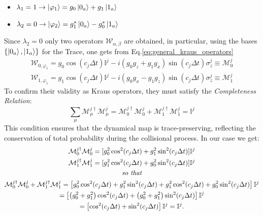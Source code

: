\documentclass[a4paper,12pt]{article}
\begin{document}
\begin{itemize}
	\item $\lambda_1 = 1 \rightarrow \ket{\varphi_1} = g_0 \ket{0_a} + g_1 \ket{1_a} $

	\item $\lambda_2 = 0 \rightarrow \ket{\varphi_2} = g_1^* \ket{0_a} - g_0^* \ket{1_a} $
\end{itemize}
Since $ \lambda_2 = 0 $ only two operators $ \mathcal{W}_{\alpha, \beta} $ are obtained, in particular, using the bases $ \{ \ket{0_{a}}, \ket{1_{a}} \} $ for the Trace, one gets from Eq.\ref{eq:general_kraus_operators}
\begin{gather}
	\mathcal{W}_{0, \varphi_{1}} = g_0 \cos{\left(c_j \Delta t \right)} \mathbb{I}^{j} - i \left(g_0 g_z + g_1 g_x \right) \sin{\left(c_j \Delta t \right)} \sigma_{z}^{j} \equiv \mathcal{M}_{0}^{j} \\
	\mathcal{W}_{1, \varphi_{1}} = g_1 \cos{\left(c_j \Delta t \right)} \mathbb{I}^{j} - i \left(g_0 g_x - g_1 g_z \right) \sin{\left(c_j \Delta t \right)} \sigma_{z}^{j} \equiv \mathcal{M}_{1}^{j}
\end{gather}
To confirm their validity as Kraus operators, they must satisfy the \textit{Completeness Relation}:
\begin{equation}
	\sum_{\mu} \mathcal{M}_{\mu}^{j \dagger} \mathcal{M}_{\mu}^{j} = \mathcal{M}_{0}^{j \dagger}\mathcal{M}_{0}^{j} + \mathcal{M}_{1}^{j \dagger}\mathcal{M}_{1}^{j} = \mathbb{I}^{j}
	\label{eq:completeness_relation}
\end{equation}
This condition ensures that the dynamical map is trace-preserving, reflecting the conservation of total probability during the collisional process.
In our case we get:
\begin{gather}
	\mathcal{M}_{0}^{j \dagger}\mathcal{M}_{0}^{j} = [g_0^2 \cos^2(c_j \Delta t) + g_1^2 \sin^2(c_j \Delta t)] \mathbb{I}^{j} \notag \\
	\mathcal{M}_{1}^{j \dagger}\mathcal{M}_{1}^{j} = [g_1^2 \cos^2(c_j \Delta t) + g_0^2 \sin^2(c_j \Delta t)] \mathbb{I}^{j} \notag \\
	\textit{so that} \notag \\
	\mathcal{M}_{0}^{j \dagger}\mathcal{M}_{0}^{j} + \mathcal{M}_{1}^{j \dagger}\mathcal{M}_{1}^{j} = \left[ g_0^2 \cos^2(c_j \Delta t) + g_1^2 \sin^2(c_j \Delta t) + g_1^2 \cos^2(c_j \Delta t) + g_0^2 \sin^2(c_j \Delta t) \right] \mathbb{I}^{j} \notag \\
	= \left[\left( g_{0}^{2} + g_{1}^{2} \right)\cos^2(c_j \Delta t) + \left( g_{0}^{2} + g_{1}^{2} \right)\sin^2(c_j \Delta t)\right] \mathbb{I}^{j} \notag \\
	= \left[\cos^2(c_j \Delta t) + \sin^2(c_j \Delta t)\right] \mathbb{I}^{j} = \mathbb{I}^{j}.
\end{gather}
\end{document}
